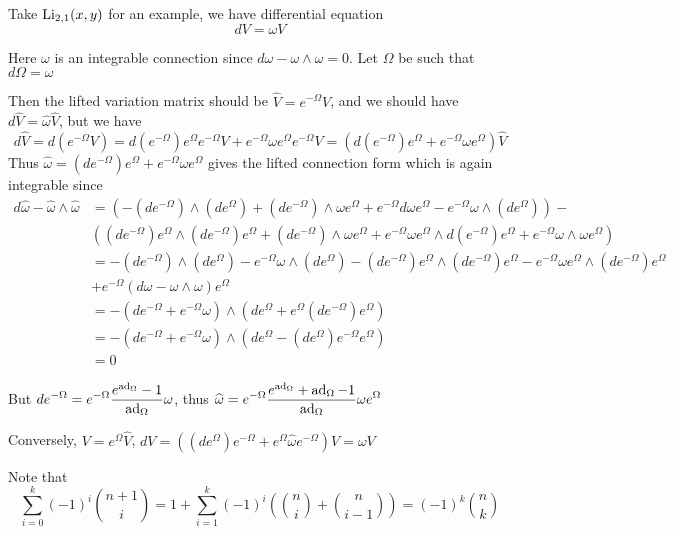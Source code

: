 \documentclass[main]{subfiles}
\begin{document}
Take $\operatorname{Li}_{2,1}(x,y)$ for an example, we have differential equation
\[dV=\omega V\]

Here $\omega$ is an integrable connection since $d\omega-\omega\wedge\omega=0$. Let $\Omega$ be such that $d\Omega=\omega$

Then the lifted variation matrix should be $\widehat V=e^{-\Omega}V$, and we should have $d\widehat V=\widehat \omega\widehat V$, but we have
\[d\widehat V=d(e^{-\Omega}V)=d(e^{-\Omega})e^\Omega e^{-\Omega}V+e^{-\Omega}\omega e^\Omega e^{-\Omega}V=(d(e^{-\Omega})e^\Omega+e^{-\Omega}\omega e^\Omega)\widehat V\]
Thus $\widehat\omega=(de^{-\Omega})e^\Omega+e^{-\Omega}\omega e^\Omega$ gives the lifted connection form which is again integrable since
\begin{align*}
d\widehat\omega-\widehat\omega\wedge\widehat\omega&=\left(-(de^{-\Omega})\wedge(de^\Omega)+(de^{-\Omega})\wedge\omega e^\Omega+e^{-\Omega}d\omega e^{\Omega}-e^{-\Omega}\omega\wedge(de^\Omega)\right)- \\
&\left((de^{-\Omega})e^\Omega\wedge(de^{-\Omega})e^\Omega+(de^{-\Omega})\wedge\omega e^\Omega+e^{-\Omega}\omega e^\Omega\wedge d(e^{-\Omega})e^\Omega+e^{-\Omega}\omega\wedge\omega e^{\Omega}\right) \\
&=-(de^{-\Omega})\wedge(de^\Omega)-e^{-\Omega}\omega\wedge(de^\Omega)-(de^{-\Omega})e^\Omega\wedge(de^{-\Omega})e^\Omega-e^{-\Omega}\omega e^\Omega\wedge (de^{-\Omega})e^\Omega \\
&+e^{-\Omega}(d\omega-\omega\wedge\omega)e^{\Omega} \\
&=-\left(de^{-\Omega}+e^{-\Omega}\omega\right)\wedge\left(de^{\Omega}+e^{\Omega}(de^{-\Omega})e^{\Omega}\right) \\
&=-\left(de^{-\Omega}+e^{-\Omega}\omega\right)\wedge\left(de^{\Omega}-(de^{\Omega})e^{-\Omega}e^{\Omega}\right) \\
&=0
\end{align*}

But $\displaystyle de^{-\Omega}=e^{-\Omega}\frac{e^{\operatorname{ad}_\Omega}-1}{\operatorname{ad}_\Omega}\omega$, thus $\displaystyle\widehat\omega=e^{-\Omega}\frac{e^{\operatorname{ad}_\Omega}+\operatorname{ad}_\Omega-1}{\operatorname{ad}_\Omega}\omega e^{\Omega}$

Conversely, $V=e^\Omega\widehat V$, $dV=((de^\Omega)e^{-\Omega}+e^{\Omega}\widehat\omega e^{-\Omega})V=\omega V$

Note that 
\[\sum_{i=0}^k(-1)^i\binom{n+1}{i}=1+\sum_{i=1}^k(-1)^i\left(\binom{n}{i}+\binom{n}{i-1}\right)=(-1)^k\binom{n}{k}\]
\end{document}
